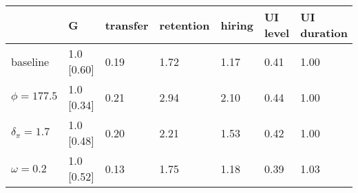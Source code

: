 \begin{tabular}{lllllll}
\toprule
 & \textbf{G} & \textbf{transfer} & \textbf{retention} & \textbf{hiring} & \textbf{UI level} & \textbf{UI duration} \\
\midrule
baseline & 1.0 [0.60] & 0.19 & 1.72 & 1.17 & 0.41 & 1.00 \\
$\phi = 177.5$ & 1.0 [0.34] & 0.21 & 2.94 & 2.10 & 0.44 & 1.00 \\
$\delta_{\pi} = 1.7$ & 1.0 [0.48] & 0.20 & 2.21 & 1.53 & 0.42 & 1.00 \\
$\omega = 0.2$ & 1.0 [0.52] & 0.13 & 1.75 & 1.18 & 0.39 & 1.03 \\
\bottomrule
\end{tabular}
